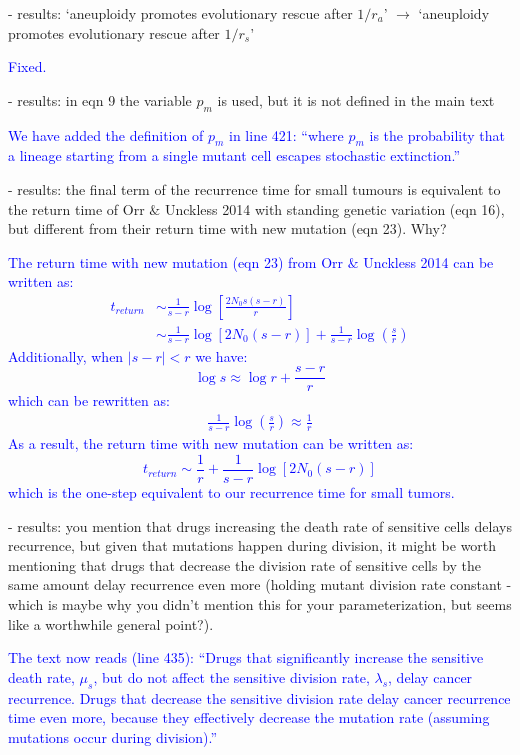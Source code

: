 \documentclass[12pt]{extarticle}
\renewcommand{\Delta}{r}
\begin{document}
- results: `aneuploidy promotes evolutionary rescue after $1/\Delta_a$' $\rightarrow$ `aneuploidy promotes evolutionary rescue after $1/\Delta_s$'

\textcolor{blue}{Fixed.} %

- results: in eqn 9 the variable $p_m$ is used, but it is not defined in the main text

\textcolor{blue}{%
We have added the definition of $p_m$ in line 421: ``where $p_m$ is the probability that a lineage starting from a single mutant cell escapes stochastic extinction.''
} 

- results: the final term of the recurrence time for small tumours is equivalent to the return time of Orr $\&$ Unckless 2014 with standing genetic variation (eqn 16), but different from their return time with new mutation (eqn 23). Why?

\textcolor{blue}{
The return time with new mutation (eqn 23) from Orr $\&$ Unckless 2014 can be written as:
\begin{align*}
t_{return}&\sim\frac{1}{s-r}\log\left[\frac{2N_0s(s-r)}{r}\right]\\
&\sim \frac{1}{s-r}\log[2N_0(s-r)]+\frac{1}{s-r}\log\left(\frac{s}{r}\right)
\end{align*}
Additionally, when $|s-r|<r$ we have:
\begin{equation*}
\log s \approx \log r +\frac{s-r}{r}
\end{equation*}
which can be rewritten as:
\begin{align*}
\frac{1}{s-r}\log\left(\frac{s}{r}\right)\approx \frac{1}{r}
\end{align*}
As a result, the return time with new mutation can be written as:
\begin{equation*}
t_{return}\sim \frac{1}{r}+\frac{1}{s-r}\log[2N_0(s-r)]
\end{equation*}
which is the one-step equivalent to our recurrence time for small tumors.
} 

- results: you mention that drugs increasing the death rate of sensitive cells delays recurrence, but given that mutations happen during division, it might be worth mentioning that drugs that decrease the division rate of sensitive cells by the same amount delay recurrence even more (holding mutant division rate constant - which is maybe why you didn't mention this for your parameterization, but seems like a worthwhile general point?).

\textcolor{blue}{%
The text now reads (line 435): ``Drugs that significantly increase the sensitive death rate, $\mu_s$, but do not affect the sensitive division rate, $\lambda_s$, delay cancer recurrence. Drugs that decrease the sensitive division rate delay cancer recurrence time even more, because they effectively decrease the mutation rate (assuming mutations occur during division).''
}
\end{document}
